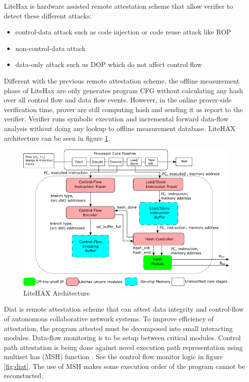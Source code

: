 LiteHax \cite{dessoukyLiteHAXLightweightHardwareassisted2018} is hardware
assisted remote attestation scheme that allow verifier to detect these different
attacks:

\begin{itemize}
    \item control-data attack such as code injection or code reuse attack like ROP
    \item non-control-data attack
    \item data-only attack such us DOP which do not affect control flow
\end{itemize}

Different with the previous remote attestation scheme, the offline measurement
phase of LiteHax are only generates program CFG without calculating any hash
over all control flow and data flow events. However, in the online prover-side
verification time, prover are still computing hash and sending it as report to
the verifier. Verifier runs symbolic execution and incremental forward data-flow
analysis without doing any lookup to offline measurement database. LiteHAX
architecture can be seen in figure \ref{fig:litehax}.

\begin{figure}[htbp]
\centerline{\includegraphics[scale=0.75]{Figures/01/litehax-overview.png}}
\caption{LiteHAX Architecture}
\label{fig:litehax}
\end{figure}

Diat \cite{aberaDIATDataIntegrity2019} is remote attestation scheme that can
attest data integrity and control-flow of autonomous collaborative network
systems. To improve efficiency of attestation, the program attested must be
decomposed into small interacting modules. Data-flow monitoring is to be setup
between critical modules. Control path attestation is being done against novel
execution path representation using multiset has (MSH) function
\cite{clarkeIncrementalMultisetHash2003}. See the control flow monitor logic in
figure \ref{fig:diat}. The use of MSH makes some execution order of the program
cannot be reconstucted.

